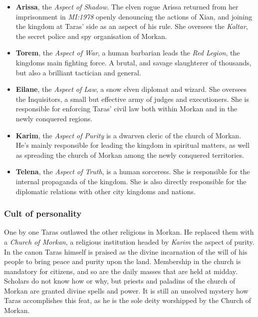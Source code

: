 \begin{itemize}[noitemsep]
  \item \textbf{Arissa}, the \emph{Aspect of Shadow}. The elven rogue Arissa
    returned from her imprisonment in \emph{MI:1978} openly denouncing the
    actions of Xian, and joining the kingdom at Taras' side as an aspect of
    his rule. She oversees the \emph{Kaltar}, the secret police and spy
    organisation of Morkan.

  \item \textbf{Torem}, the \emph{Aspect of War}, a human barbarian leads the
    \emph{Red Legion}, the kingdoms main fighting force. A brutal, and savage
    slaughterer of thousands, but also a brilliant tactician and general.

  \item \textbf{Eilane}, the \emph{Aspect of Law}, a snow elven diplomat and
    wizard. She oversees the Inquisitors, a small but effective army of judges
    and executioners. She is responsible for enforcing Taras' civil law both
    within Morkan and in the newly conquered regions.

  \item \textbf{Karim}, the \emph{Aspect of Purity} is a dwarven cleric of the
    church of Morkan. He's mainly responsible for leading the kingdom in
    spiritual matters, as well as spreading the church of Morkan among the
    newly conquered territories.

  \item \textbf{Telena}, the \emph{Aspect of Truth}, is a human sorceress. She
    is responsible for the internal propaganda of the kingdom. She is also
    directly responsible for the diplomatic relations with other city kingdoms
    and nations.

\end{itemize}

\subsubsection{Cult of personality}

One by one Taras outlawed the other religions in Morkan. He replaced them with
a \emph{Church of Morkan}, a religious institution headed by \emph{Karim} the
aspect of purity. In the canon Taras himself is praised as the divine
incarnation of the will of his people to bring peace and purity upon the
land. Membership in the church is mandatory for citizens, and so are the daily
masses that are held at midday. Scholars do not know how or why, but priests
and paladins of the church of Morkan are granted divine spells and power. It
is still an unsolved mystery how Taras accomplishes this feat, as he is the
sole deity worshipped by the Church of Morkan.


